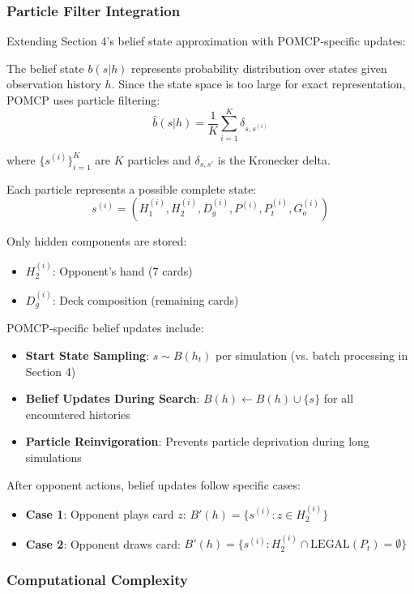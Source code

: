 \documentclass[journal,transmag]{IEEEtran}
\begin{document}
\subsubsection{Particle Filter Integration}

Extending Section 4's belief state approximation with POMCP-specific updates:

The belief state $b(s|h)$ represents probability distribution over states given observation history $h$. Since the state space is too large for exact representation, POMCP uses particle filtering:
$$\hat{b}(s|h) = \frac{1}{K} \sum_{i=1}^{K} \delta_{s,s^{(i)}}$$

where $\{s^{(i)}\}_{i=1}^{K}$ are $K$ particles and $\delta_{s,s'}$ is the Kronecker delta.

Each particle represents a possible complete state:
$$s^{(i)} = (H_1^{(i)}, H_2^{(i)}, D_g^{(i)}, P^{(i)}, P_t^{(i)}, G_o^{(i)})$$

Only hidden components are stored:
\begin{itemize}
    \item $H_2^{(i)}$: Opponent's hand (7 cards)
    \item $D_g^{(i)}$: Deck composition (remaining cards)
\end{itemize}

POMCP-specific belief updates include:
\begin{itemize}
    \item \textbf{Start State Sampling}: $s \sim B(h_t)$ per simulation (vs. batch processing in Section 4)
    \item \textbf{Belief Updates During Search}: $B(h) \leftarrow B(h) \cup \{s\}$ for all encountered histories
    \item \textbf{Particle Reinvigoration}: Prevents particle deprivation during long simulations
\end{itemize}

After opponent actions, belief updates follow specific cases:
\begin{itemize}
    \item \textbf{Case 1}: Opponent plays card $z$: $B'(h) = \{s^{(i)} : z \in H_2^{(i)}\}$
    \item \textbf{Case 2}: Opponent draws card: $B'(h) = \{s^{(i)} : H_2^{(i)} \cap \text{LEGAL}(P_t) = \emptyset\}$
\end{itemize}

\subsubsection{Computational Complexity}
\end{document}
